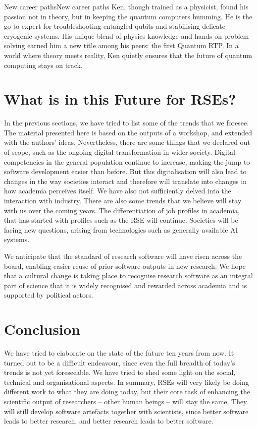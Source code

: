 \documentclass{eceasst}
\begin{document}
\begin{story}{New career paths}{New career paths}
Ken, though trained as a physicist, found his passion not in theory,
but in keeping the quantum computers humming. He is the go-to expert
for troubleshooting entangled qubits and stabilising delicate cryogenic systems.
His unique blend of physics knowledge and hands-on problem solving earned him
a new title among his peers: the first Quantum RTP.
In a world where theory meets reality, Ken quietly ensures that the future
of quantum computing stays on track.
\end{story}

\section{What is in this Future for RSEs?}
In the previous sections, we have tried to list some of the trends that we foresee.
The material presented here is based on the outputs of a workshop, and extended with the authors' ideas.
Nevertheless, there are some things that we declared out of scope, such as the ongoing digital transformation in wider society.
Digital competencies in the general population continue to increase,
making the jump to software development easier than before.
But this digitalisation will also lead to changes in the way societies
interact and therefore will translate into changes in how academia perceives itself.
We have also not sufficiently delved into the interaction with industry.
There are also some trends that we believe will stay with us over the coming years.
The differentiation of job profiles in academia, that has started with profiles such as the RSE will continue.
Societies will be facing new questions, arising from technologies such as generally available AI systems.

We anticipate that the standard of research software will have risen across the board,
enabling easier reuse of prior software outputs in new research.
We hope that a cultural change is taking place to recognise research software
as an integral part of science that it is widely recognised and rewarded across
academia and is supported by political actors.

\section{Conclusion}
We have tried to elaborate on the state of the future ten years from now.
It turned out to be a difficult endeavour, since even the full breadth of today's trends is not yet foreseeable.
We have tried to shed some light on the social, technical and organisational aspects.
In summary, RSEs will very likely be doing different work to what they are doing today,
but their core task of enhancing the scientific output of researchers -- other human
beings -- will stay the same.
They will still develop software artefacts together with scientists,
since better software leads to better research,
and better research leads to better software.
\end{document}
